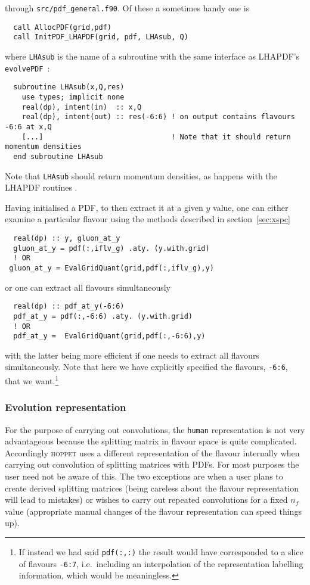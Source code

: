 \documentclass[12pt]{article}
\newcommand{\ie}{i.e.\ }
\newcommand{\hoppet}{\textsc{hoppet}\xspace}
\newcommand{\ttt}[1]{\texttt{#1}}
\begin{document}
through \ttt{src/pdf\_general.f90}. Of these a sometimes handy one is
\begin{lstlisting}
  call AllocPDF(grid,pdf)
  call InitPDF_LHAPDF(grid, pdf, LHAsub, Q)
\end{lstlisting}
where \texttt{LHAsub} is the name of a subroutine 
with the same interface as LHAPDF's \ttt{evolvePDF}~\cite{LHAPDF}:
\begin{lstlisting}
  subroutine LHAsub(x,Q,res)
    use types; implicit none
    real(dp), intent(in)  :: x,Q
    real(dp), intent(out) :: res(-6:6) ! on output contains flavours -6:6 at x,Q
    [...]                              ! Note that it should return momentum densities
  end subroutine LHAsub
\end{lstlisting}
Note that {\tt LHAsub} should return momentum densities, as
happens with the LHAPDF routines \cite{LHAPDF}.


Having initialised a PDF, to then extract it at a given $y$ value, one
can either examine a particular flavour using the methods described in
section~\ref{sec:xspc}
\begin{lstlisting}
  real(dp) :: y, gluon_at_y
  gluon_at_y = pdf(:,iflv_g) .aty. (y.with.grid)
  ! OR
 gluon_at_y = EvalGridQuant(grid,pdf(:,iflv_g),y) 
\end{lstlisting}
or one can extract all flavours simultaneously
\begin{lstlisting}
  real(dp) :: pdf_at_y(-6:6)
  pdf_at_y = pdf(:,-6:6) .aty. (y.with.grid)
  ! OR
  pdf_at_y =  EvalGridQuant(grid,pdf(:,-6:6),y) 
\end{lstlisting}
with the latter being more efficient if one needs to extract all
flavours simultaneously. Note that here we have explicitly specified
the flavours, \ttt{-6:6}, that we want.\footnote{If instead we had
  said \ttt{pdf(:,:)} the result would have corresponded to a slice of
  flavours \ttt{-6:7}, \ie including an interpolation of the
  representation labelling information, which would be meaningless.}


\subsubsection{Evolution representation} 
\label{sec:evln-rep}
%
For the purpose of carrying out convolutions, the \ttt{human}
representation is not very advantageous because the splitting matrix
in flavour space is quite complicated. Accordingly \hoppet uses a
different representation of the flavour internally when carrying out
convolution of splitting matrices with PDFs. For most purposes the
user need not be aware of this. The two exceptions are when a user
plans to create derived splitting matrices (being careless about the
flavour representation will lead to mistakes) or wishes to carry out
repeated convolutions for a fixed $n_f$ value (appropriate manual
changes of the flavour representation can speed things up).
\end{document}
